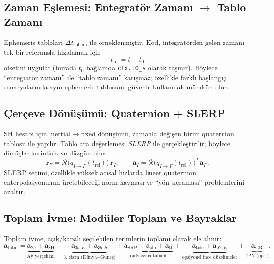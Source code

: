 \subsection*{Zaman Eşlemesi: Entegratör Zamanı \texorpdfstring{\(\rightarrow\)}{->} Tablo Zamanı}
Ephemeris tabloları \(\Delta t_{\mathrm{ephem}}\) ile örneklenmiştir.
Kod, integratörden gelen zamanı tek bir referansla hizalamak için
\begin{equation}
t_{\mathrm{rel}} = t - t_0
\end{equation}
ofsetini uygular (burada \(t_0\) bağlamda \texttt{ctx.t0\_s} olarak taşınır).
Böylece ``entegratör zamanı'' ile ``tablo zamanı'' karışmaz; özellikle farklı başlangıç senaryolarında
aynı ephemeris tablosunu güvenle kullanmak mümkün olur.

\subsection*{Çerçeve Dönüşümü: Quaternion + SLERP}
SH hesabı için inertial\(\rightarrow\)fixed dönüşümü, zamanla değişen birim quaternion tablosu ile yapılır.
Tablo ara değerlemesi \emph{SLERP} ile gerçekleştirilir; böylece dönüşler kesintisiz ve düzgün olur:
\begin{equation}
\mathbf{r}_F = \mathcal{R}\big(q_{I\rightarrow F}(t_{\mathrm{rel}})\big)\,\mathbf{r}_I,
\qquad
\mathbf{a}_I = \mathcal{R}\big(q_{I\rightarrow F}(t_{\mathrm{rel}})\big)^{T}\,\mathbf{a}_F.
\end{equation}
SLERP seçimi, özellikle yüksek açısal hızlarda lineer quaternion enterpolasyonunun üretebileceği
norm kayması ve ``yön sıçraması'' problemlerini azaltır.

\subsection*{Toplam İvme: Modüler Toplam ve Bayraklar}
Toplam ivme, açık/kapalı seçilebilen terimlerin toplamı olarak ele alınır:
\begin{equation}
\mathbf{a}_\text{total}=
\underbrace{\mathbf{a}_{2b}+\mathbf{a}_\text{SH}}_{\text{Ay yerçekimi}}
+\underbrace{\mathbf{a}_{3b,E}+\mathbf{a}_{3b,S}}_{\text{3. cisim (Dünya+Güneş)}}
+\underbrace{\mathbf{a}_\text{SRP}+\mathbf{a}_\text{alb}+\mathbf{a}_\text{th}}_{\text{radyasyon tabanlı}}
+\underbrace{\mathbf{a}_\text{tide}+\mathbf{a}_{J2,E}}_{\text{opsiyonel ince düzeltmeler}}
+\underbrace{\mathbf{a}_\text{GR}}_{\text{1PN (ops.)}}.
\label{eq:atotal_sum}
\end{equation}

